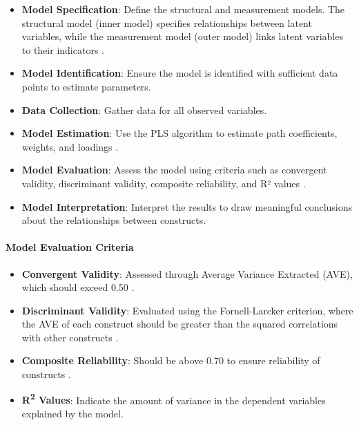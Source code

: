 \begin{itemize}
    \item \textbf{Model Specification}: Define the structural and measurement models. The structural model (inner model) specifies relationships between latent variables, while the measurement model (outer model) links latent variables to their indicators \parencite{Lohmoller1989LatentSquares}.

    \item \textbf{Model Identification}: Ensure the model is identified with sufficient data points to estimate parameters.

    \item \textbf{Data Collection}: Gather data for all observed variables.

    \item \textbf{Model Estimation}: Use the PLS algorithm to estimate path coefficients, weights, and loadings \parencite{Wold1985SystemsSquares}.

    \item \textbf{Model Evaluation}: Assess the model using criteria such as convergent validity, discriminant validity, composite reliability, and R² values \parencite{Tenenhaus2005PLSModeling}.

    \item \textbf{Model Interpretation}: Interpret the results to draw meaningful conclusions about the relationships between constructs.
\end{itemize}

\paragraph{Model Evaluation Criteria}

\begin{itemize}
    \item \textbf{Convergent Validity}: Assessed through Average Variance Extracted (AVE), which should exceed 0.50 \parencite{Henseler2015AModeling}.

    \item \textbf{Discriminant Validity}: Evaluated using the Fornell-Larcker criterion, where the AVE of each construct should be greater than the squared correlations with other constructs \parencite{Henseler2015AModeling}.

    \item \textbf{Composite Reliability}: Should be above 0.70 to ensure reliability of constructs \parencite{Sarstedt2017PartialModeling}.

    \item \textbf{R\textsuperscript{2} Values}: Indicate the amount of variance in the dependent variables explained by the model.
\end{itemize}

